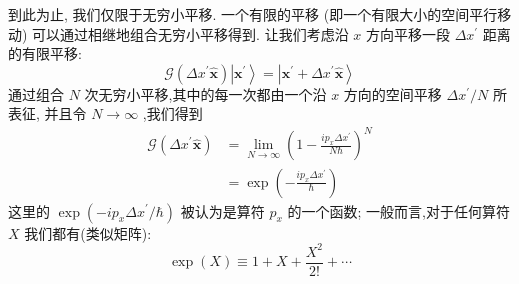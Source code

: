 \documentclass[lang=cn,newtx,10pt,scheme=chinese,thmcnt=section]{elegantbook}
\begin{document}
到此为止, 我们仅限于无穷小平移. 一个有限的平移 (即一个有限大小的空间平行移动) 可以通过相继地组合无穷小平移得到. 让我们考虑沿 $x$ 方向平移一段 $\Delta {x}^{\prime }$ 距离的有限平移:
\begin{equation}
	\mathscr{G} \left( {\Delta {x}^{\prime }\widehat{\mathbf{x}}}\right) \left| {\mathbf{x}}^{\prime }\right\rangle = \left| {{\mathbf{x}}^{\prime } + \Delta {x}^{\prime }\widehat{\mathbf{x}}}\right\rangle
\end{equation}
通过组合 $N$ 次无穷小平移,其中的每一次都由一个沿 $x$ 方向的空间平移 $\Delta {x}^{\prime }/N$ 所表征, 并且令 $N \rightarrow \infty$ ,我们得到
\begin{equation}
	\begin{aligned}
		\mathscr{G}\left( {\Delta {x}^{\prime }\widehat{\mathbf{x}}}\right) &= \mathop{\lim }\limits_{{N \rightarrow \infty }}{\left( 1 - \frac{i{p}_{x}\Delta {x}^{\prime }}{N\hbar }\right) }^{N}\\
		&= \exp \left( {-\frac{i{p}_{x}\Delta {x}^{\prime }}{\hbar }}\right)
	\end{aligned}
\end{equation}
这里的 $\exp \left( {-i{p}_{x}\Delta {x}^{\prime }/\hbar }\right)$ 被认为是算符 ${p}_{x}$ 的一个函数; 一般而言,对于任何算符 $X$ 我们都有(类似矩阵):
\begin{equation}
	\exp \left( X\right) \equiv 1 + X + \frac{{X}^{2}}{2!} + \cdots
\end{equation}
\end{document}
